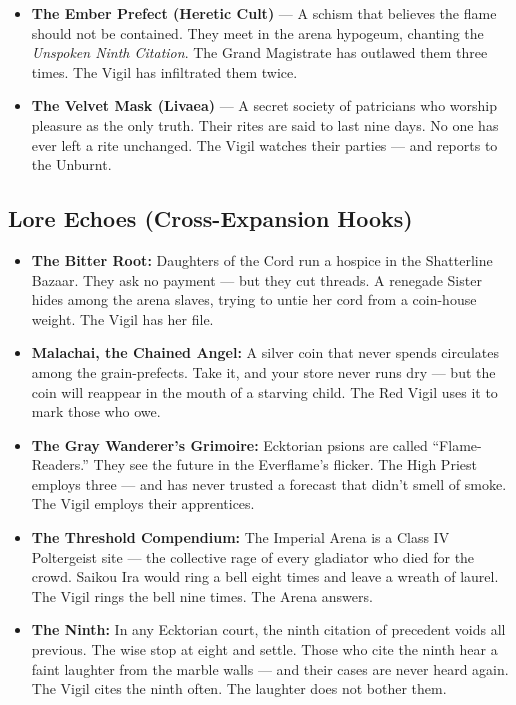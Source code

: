 \begin{itemize}
\begin{itemize}
    \item \textbf{The Ember Prefect (Heretic Cult)} --- A schism that believes the flame should not be contained. They meet in the arena hypogeum, chanting the \textit{Unspoken Ninth Citation}. The Grand Magistrate has outlawed them three times. The Vigil has infiltrated them twice.
    \item \textbf{The Velvet Mask (Livaea)} --- A secret society of patricians who worship pleasure as the only truth. Their rites are said to last nine days. No one has ever left a rite unchanged. The Vigil watches their parties --- and reports to the Unburnt.
  \end{itemize}
\end{itemize}

\subsection*{Lore Echoes (Cross-Expansion Hooks)}
\begin{itemize}
  \item \textbf{The Bitter Root:} Daughters of the Cord run a hospice in the Shatterline Bazaar. They ask no payment --- but they cut threads. A renegade Sister hides among the arena slaves, trying to untie her cord from a coin-house weight. The Vigil has her file.
  \item \textbf{Malachai, the Chained Angel:} A silver coin that never spends circulates among the grain-prefects. Take it, and your store never runs dry --- but the coin will reappear in the mouth of a starving child. The Red Vigil uses it to mark those who owe.
  \item \textbf{The Gray Wanderer's Grimoire:} Ecktorian psions are called ``Flame-Readers.'' They see the future in the Everflame's flicker. The High Priest employs three --- and has never trusted a forecast that didn't smell of smoke. The Vigil employs their apprentices.
  \item \textbf{The Threshold Compendium:} The Imperial Arena is a Class IV Poltergeist site --- the collective rage of every gladiator who died for the crowd. Saikou Ira would ring a bell eight times and leave a wreath of laurel. The Vigil rings the bell nine times. The Arena answers.
  \item \textbf{The Ninth:} In any Ecktorian court, the ninth citation of precedent voids all previous. The wise stop at eight and settle. Those who cite the ninth hear a faint laughter from the marble walls --- and their cases are never heard again. The Vigil cites the ninth often. The laughter does not bother them.
\end{itemize}

